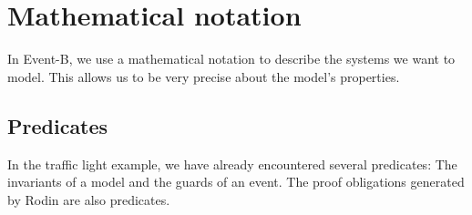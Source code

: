 \newcommand{\lascii}[1]{\qquad\quad \textrm{ASCII: } \texttt{#1}}
\newcommand{\inascii}[1]{(ASCII: \texttt{#1})}

\section{Mathematical notation}
\label{tut_mathematical_notation}
In Event-B, we use a mathematical notation to describe the systems we want to model.
This allows us to be very precise about the model's properties.

\subsection{Predicates}
\label{tut_predicates}
In the traffic light example, we have already encountered several predicates: The invariants of a model and the guards of an event. The proof obligations generated by Rodin are also predicates.

